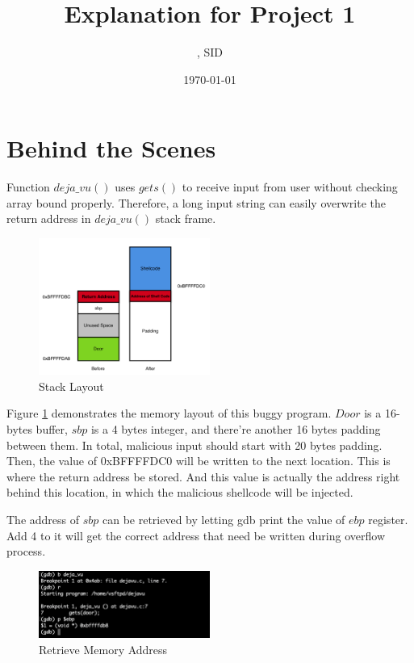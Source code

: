 \documentclass{article}
\title{Explanation for Project 1}
\author{\Name, SID \SID}
\date{\today}
\begin{document}
\maketitle

\section{Behind the Scenes}

Function $deja\_vu()$ uses $gets()$ to receive input from user without checking array bound properly. Therefore, a long input string can easily overwrite the return address in $deja\_vu()$ stack frame. 

\begin{figure}[h]
\centering
\includegraphics[width=0.5\textwidth]{stack1.png}
\caption{\label{fig:stack1}Stack Layout}
\end{figure}

Figure \ref{fig:stack1} demonstrates the memory layout of this buggy program. $Door$ is a 16-bytes buffer, $sbp$ is a 4 bytes integer, and there're another 16 bytes padding between them. In total, malicious input should start with 20 bytes padding. Then, the value of 0xBFFFFDC0 will be written to the next location. This is where the return address be stored. And this value is actually the address right behind this location, in which the malicious shellcode will be injected. 

The address of $sbp$ can be retrieved by letting gdb print the value of $ebp$ register. Add 4 to it will get the correct address that need be written during overflow process.

\begin{figure}[h]
\centering
\includegraphics[width=0.5\textwidth]{gdb1.png}
\caption{\label{fig:gdb1}Retrieve Memory Address}
\end{figure}
\end{document}
